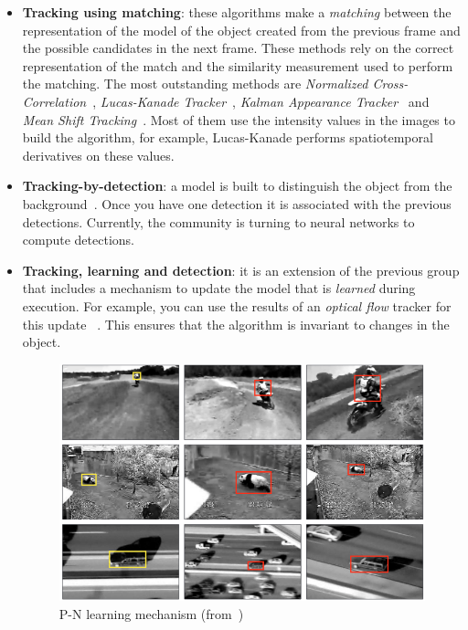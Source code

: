 \begin{itemize}
\item \textbf{Tracking using matching}: these algorithms make a \textit {matching} between the representation of the model of the object created from the previous frame and the possible candidates in the next frame. These methods rely on the correct representation of the match and the similarity measurement used to perform the matching. The most outstanding methods are \textit{Normalized Cross-Correlation}~\cite{briechle2001template}, \textit{Lucas-Kanade Tracker}~\cite {baker2004lucas}, \textit{Kalman Appearance Tracker}~\cite{nguyen2004fast} and \textit{Mean Shift Tracking}~\cite{comaniciu2000real}. Most of them use the intensity values in the images to build the algorithm, for example, Lucas-Kanade performs spatiotemporal derivatives on these values.
\item \textbf{Tracking-by-detection}: a model is built to distinguish the object from the background~\cite{nguyen2006robust}. Once you have one detection it is associated with the previous detections. Currently, the community is turning to neural networks to compute detections.
\item \textbf{Tracking, learning and detection}: it is an extension of the previous group that includes a mechanism to update the model that is \textit{learned} during execution. For example, you can use the results of an \textit{optical flow} tracker for this update ~\cite{kalal2010pn}. This ensures that the algorithm is invariant to changes in the object.
\begin{figure}[H]
\begin{center}
\includegraphics[scale=0.3]{figures/pn_learning.png}
\caption{P-N learning mechanism (from~\cite{kalal2010pn})}
\label{fig:pn}
\end{center}
\end{figure}
\end{itemize}
